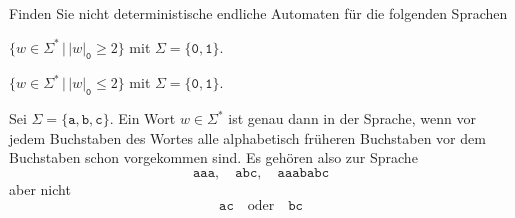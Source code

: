 Finden Sie nicht deterministische endliche Automaten für die folgenden
Sprachen
\begin{teilaufgaben}
\item
$\{w\in\Sigma^*\,|\, |w|_{\texttt{0}}\ge 2\}$ mit
$\Sigma=\{\texttt{0},\texttt{1}\}$.
\item
$\{w\in\Sigma^*\,|\, |w|_{\texttt{0}}\le 2\}$ mit
$\Sigma=\{\texttt{0},\texttt{1}\}$.
\item
Sei $\Sigma=\{\texttt{a},\texttt{b},\texttt{c}\}$.
Ein Wort $w\in\Sigma^*$ ist genau dann in der Sprache, wenn vor jedem
Buchstaben des Wortes alle alphabetisch früheren Buchstaben vor dem Buchstaben
schon vorgekommen sind.
Es gehören also zur Sprache
\[
\texttt{aaa},\quad
\texttt{abc},\quad
\texttt{aaababc}
\]
aber nicht
\[
\texttt{ac}
\quad\text{oder}\quad
\texttt{bc}
\]
\end{teilaufgaben}


